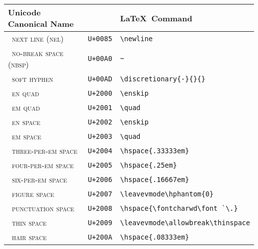 \documentclass{scrartcl}
\begin{document}
\def\checkno	{\!\!\llap{\textcolor{red}{~\textbf{\ding{55}}}}}
\def\checkyes	{\!\!\llap{\textcolor{green}{~\textbf{\ding{51}}}}}

\begin{table}
\begin{tabular}{@{}lll@{}}
\textbf{Unicode Canonical Name}						&	&	\textbf{\LaTeX ~Command} \\\midrule
\checkyes ~\textsc{next line (nel)}					&	\texttt{U+0085}	&	\verb+\newline+\\
\checkyes ~\textsc{no-break space (nbsp)}			&	\texttt{U+00A0}	&	\verb+~+\\
\checkyes ~\textsc{soft hyphen}						&	\texttt{U+00AD}	&	\verb+\discretionary{-}{}{}+\\
\checkyes ~\textsc{en quad}							&	\texttt{U+2000}	&	\verb+\enskip+\\
\checkyes ~\textsc{em quad}							&	\texttt{U+2001}	&	\verb+\quad+\\
\checkyes ~\textsc{en space}						&	\texttt{U+2002}	&	\verb+\enskip+\\
\checkyes ~\textsc{em space}						&	\texttt{U+2003}	&	\verb+\quad+\\
\checkyes ~\textsc{three-per-em space}				&	\texttt{U+2004}	&	\verb+\hspace{.33333em}+\\
\checkyes ~\textsc{four-per-em space}				&	\texttt{U+2005}	&	\verb+\hspace{.25em}+\\
\checkyes ~\textsc{six-per-em space}				&	\texttt{U+2006}	&	\verb+\hspace{.16667em}+\\
\checkyes ~\textsc{figure space} 					&	\texttt{U+2007}	&	\verb+\leavevmode\hphantom{0}+ \\
\checkyes ~\textsc{punctuation space}				&	\texttt{U+2008}	&	\verb+\hspace{\fontcharwd\font `\.}+ \\
\checkyes ~\textsc{thin space}						&	\texttt{U+2009}	&	\verb+\leavevmode\allowbreak\thinspace+ \\
\checkyes ~\textsc{hair space} 						&	\texttt{U+200A}	&	\verb+\hspace{.08333em}+\\

\end{tabular}
\end{table}
\end{document}
